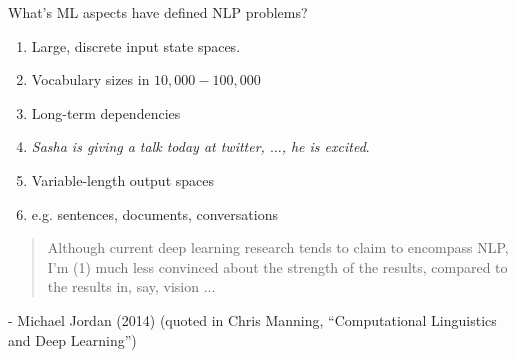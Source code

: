 \documentclass{beamer}
\let\tempone\itemize
\let\temptwo\enditemize
\renewenvironment{itemize}{\tempone\addtolength{\itemsep}{0.5\baselineskip}}{\temptwo}
\newcommand{\air}{\vspace{0.25cm}}
\begin{document}
\begin{frame}{}
  \begin{center}
    What's ML aspects have defined NLP problems? 
  \end{center}

  \begin{enumerate}
    \air
  \item  Large, discrete input state spaces.
    \begin{itemize}
    \item Vocabulary sizes in $10,000 - 100,000$
    \end{itemize}
    \air
  \item  Long-term dependencies
    \begin{itemize}
    \item \textit{Sasha is  giving a talk today at twitter, $\ldots$, he is excited}.  
    \end{itemize}
    \air
  \item Variable-length output spaces 
    \begin{itemize}
    \item  e.g. sentences, documents, conversations
    \end{itemize}
    \air
  \end{enumerate}
\end{frame}

\begin{frame}
  \begin{block}{}
    \begin{quote}
      Although current deep learning research tends to claim to
      encompass NLP, I'm (1) much less convinced about the strength of
      the results, compared to the results in, say, vision ...
    \end{quote}
  \end{block}
  \begin{flushright}
    - Michael Jordan (2014) (quoted in Chris Manning, ``Computational Linguistics and Deep Learning'')
  \end{flushright}
\end{frame}
\end{document}
